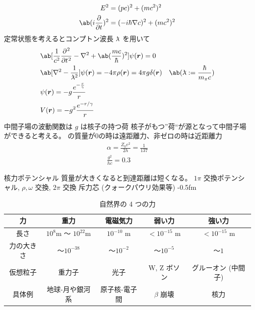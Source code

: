 \documentclass[uplatex,dvipdfmx,a4paper,11pt]{jlreq}
\newcommand{\rr}{\bm{r}}
\newcommand{\lbar}{\lambda \kern -0.5em\raise 0.5ex \hbox{--}}
\numberwithin{equation}{section}
\theoremstyle{definition}
\begin{document}
\begin{align}
  E^2                 & = (pc)^2 + (mc^2)^2              \\
  \ab(i\diffp{}{t})^2 & = (-i\hbar\nabla c)^2 + (mc^2)^2
\end{align}
定常状態を考えるとコンプトン波長 $\lbar$ を用いて
\begin{align}
   & \ab[\frac{1}{c^2}\diffp[2]{}{t} - \nabla^2 + \ab(\frac{mc}{\hbar})^2]\psi(\rr) = 0                                       \\
   & \ab[\nabla^2 - \frac{1}{\lbar^2}]\psi(\rr) = -4\pi\rho(\rr) = 4\pi g\delta(\rr)    & \ab(\lbar := \frac{\hbar}{m_\pi c}) \\
   & \psi(\rr) = -g\frac{e^{-\frac{r}{\gamma}}}{r}                                                                            \\
   & V(\rr) = -g^2\frac{e^{-r/\gamma}}{r}
\end{align}
中間子場の波動関数は $g$ は核子の持つ荷
核⼦がもつ”荷“が源となって中間⼦場ができると考える。
の質量が0の時は遠距離⼒、⾮ゼロの時は近距離⼒
\begin{align}
  \alpha = \frac{Z_0 e^2}{2h} = \frac{1}{137} \\
  \frac{g^2}{hc} = 0.3
\end{align}

核⼒ポテンシャル
質量が大きくなると到達距離は短くなる。
$1\pi$ 交換ポテンシャル, $\rho, \omega$ 交換, $2\pi$ 交換
斥力芯 (クォークパウリ効果等) -0.5fm

\begin{table}[hbtp]
  \centering
  \begin{tabular}{|c|c|c|c|c|}
    \hline
    力     & 重力                             & 電磁気力              & 弱い力                & 強い力                \\
    \hline \hline
    長さ    & $10^8$\si{m} ～ $10^{22}$\si{m} & $10^{-10}$ \si{m} & $<10^{-15}$ \si{m} & $<10^{-15}$ \si{m} \\
    力の大きさ & ～$10^{-38}$                    & ～$10^{-2}$        & ～$10^{-5}$         & ～$1$               \\
    仮想粒子  & 重力子                            & 光子                & W, Z ボソン           & グルーオン (中間子)        \\
    具体例   & 地球-月や銀河系                       & 原子核-電子間           & $\beta$ 崩壊         & 核力                 \\
    \hline
  \end{tabular}
  \caption{自然界の 4 つの力}
  \label{table:force}
\end{table}
\end{document}
